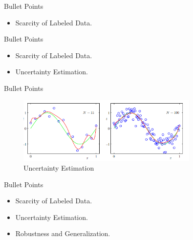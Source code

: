 \documentclass[aspectratio=169,xcolor=dvipsnames, t]{beamer}
\begin{document}
\begin{frame}{Bullet Points}
    \begin{itemize}
        \item Scarcity of Labeled Data.
    \end{itemize}
\end{frame}
\begin{frame}{Bullet Points}
    \begin{itemize}
        \item Scarcity of Labeled Data.
        \item Uncertainty Estimation.
    \end{itemize}
\end{frame}
\begin{frame}{Bullet Points}
  
\begin{figure}
        \centering
        \includegraphics[width=0.8\textwidth,height=0.8\textheight,keepaspectratio]{images/regression.png}
        \caption{Uncertainty Estimation}
    \end{figure}
\end{frame}
\begin{frame}{Bullet Points}
    \begin{itemize}
     \item Scarcity of Labeled Data.
        \item Uncertainty Estimation.
        \item Robustness and Generalization.
    \end{itemize}
\end{frame}
\end{document}
